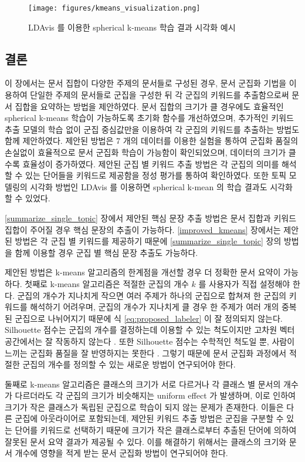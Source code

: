 \documentclass[11pt]{article}
\begin{document}
\begin{figure}[H]
\centering
\texttt{[image: figures/kmeans\_visualization.png]}
\label{fig:kmeans_ldavis}
\caption{LDAvis 를 이용한 spherical k-means 학습 결과 시각화 예시}
\end{figure}


\subsection{결론}

이 장에서는 문서 집합이 다양한 주제의 문서들로 구성된 경우, 문서 군집화 기법을 이용하여 단일한 주제의 문서들로 군집을 구성한 뒤 각 군집의 키워드를 추출함으로써 문서 집합을 요약하는 방법을 제안하였다.
문서 집합의 크기가 클 경우에도 효율적인 spherical k-means 학습이 가능하도록 초기화 함수를 개선하였으며, 추가적인 키워드 추출 모델의 학습 없이 군집 중심값만을 이용하여 각 군집의 키워드를 추출하는 방법도 함께 제안하였다.
제안된 방법은 7 개의 데이터를 이용한 실험을 통하여 군집화 품질의 손실없이 효율적으로 문서 군집화 학습이 가능함이 확인되었으며, 데이터의 크기가 클수록 효율성이 증가하였다.
제안된 군집 별 키워드 추출 방법은 각 군집의 의미를 해석할 수 있는 단어들을 키워드로 제공함을 정성 평가를 통하여 확인하였다.
또한 토픽 모델링의 시각화 방법인 LDAvis 를 이용하면 spherical k-mean 의 학습 결과도 시각화 할 수 있었다.

\ref{summarize_single_topic} 장에서 제안된 핵심 문장 추출 방법은 문서 집합과 키워드 집합이 주어질 경우 핵심 문장의 추출이 가능하다.
\ref{improved_kmeans} 장에서는 제안된 방법은 각 군집 별 키워드를 제공하기 때문에 \ref{summarize_single_topic} 장의 방법을 함께 이용할 경우 군집 별 핵심 문장 추출도 가능하다.

제안된 방법은 k-means 알고리즘의 한계점을 개선할 경우 더 정확한 문서 요약이 가능하다.
첫째로 k-means 알고리즘은 적절한 군집의 개수 $k$ 를 사용자가 직접 설정해야 한다.
군집의 개수가 지나치게 작으면 여러 주제가 하나의 군집으로 합쳐져 한 군집의 키워드를 해석하기 어려우며, 군집의 개수가 지나치게 클 경우 한 주제가 여러 개의 중복된 군집으로 나뉘어지기 때문에 식 \ref{eq:proposed_labeler} 이 잘 정의되지 않는다.
Silhouette 점수는 군집의 개수를 결정하는데 이용할 수 있는 척도이지만 고차원 벡터 공간에서는 잘 작동하지 않는다 \citep{almeida2011there}.
또한 Silhouette 점수는 수학적인 척도일 뿐, 사람이 느끼는 군집화 품질을 잘 반영하지는 못한다 \citep{newman2010evaluating}.
그렇기 때문에 문서 군집화 과정에서 적절한 군집의 개수를 정의할 수 있는 새로운 방법이 연구되어야 한다.

둘째로 k-means 알고리즘은 클래스의 크기가 서로 다르거나 각 클래스 별 문서의 개수가 다르더라도 각 군집의 크기가 비슷해지는 uniform effect \citep{xiong2008k} 가 발생하며, 이로 인하여 크기가 작은 클래스가 독립된 군집으로 학습이 되지 않는 문제가 존재한다.
이들은 다른 군집에 아웃라이어로 포함되는데, 제안된 키워드 추출 방법은 군집을 구분할 수 있는 단어를 키워드로 선택하기 때문에 크기가 작은 클래스로부터 추출된 단어에 의하여 잘못된 문서 요약 결과가 제공될 수 있다.
이를 해결하기 위해서는 클래스의 크기와 문서 개수에 영향을 적게 받는 문서 군집화 방법이 연구되어야 한다.
\end{document}
